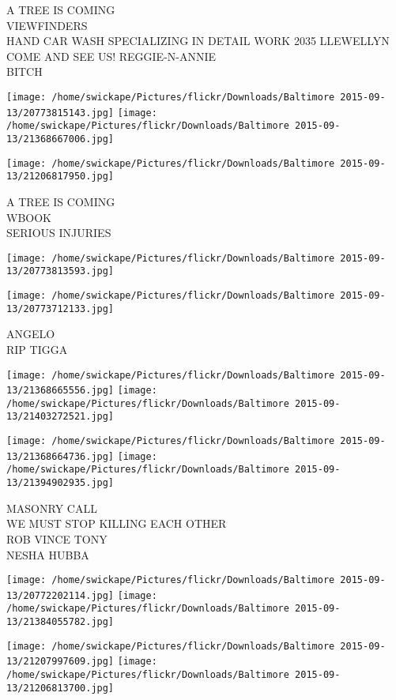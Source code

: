 \documentclass[10pt,letterpaper]{article}
\begin{document}
A TREE IS COMING\\
VIEWFINDERS\\
HAND CAR WASH SPECIALIZING IN DETAIL WORK 2035 LLEWELLYN COME AND SEE US!  REGGIE{-}N{-}ANNIE\\
BITCH
\pagebreak

\texttt{[image: /home/swickape/Pictures/flickr/Downloads/Baltimore 2015-09-13/20773815143.jpg]}
\texttt{[image: /home/swickape/Pictures/flickr/Downloads/Baltimore 2015-09-13/21368667006.jpg]}

\texttt{[image: /home/swickape/Pictures/flickr/Downloads/Baltimore 2015-09-13/21206817950.jpg]}

A TREE IS COMING\\
WBOOK\\
SERIOUS INJURIES
\pagebreak

\texttt{[image: /home/swickape/Pictures/flickr/Downloads/Baltimore 2015-09-13/20773813593.jpg]}

\vspace{0.25in}
\texttt{[image: /home/swickape/Pictures/flickr/Downloads/Baltimore 2015-09-13/20773712133.jpg]}

ANGELO\\
RIP TIGGA
\pagebreak

\texttt{[image: /home/swickape/Pictures/flickr/Downloads/Baltimore 2015-09-13/21368665556.jpg]}
\texttt{[image: /home/swickape/Pictures/flickr/Downloads/Baltimore 2015-09-13/21403272521.jpg]}

\texttt{[image: /home/swickape/Pictures/flickr/Downloads/Baltimore 2015-09-13/21368664736.jpg]}
\texttt{[image: /home/swickape/Pictures/flickr/Downloads/Baltimore 2015-09-13/21394902935.jpg]}

MASONRY CALL\\
WE MUST STOP KILLING EACH OTHER\\
ROB VINCE TONY\\
NESHA HUBBA
\pagebreak

\texttt{[image: /home/swickape/Pictures/flickr/Downloads/Baltimore 2015-09-13/20772202114.jpg]}
\texttt{[image: /home/swickape/Pictures/flickr/Downloads/Baltimore 2015-09-13/21384055782.jpg]}

\texttt{[image: /home/swickape/Pictures/flickr/Downloads/Baltimore 2015-09-13/21207997609.jpg]}
\texttt{[image: /home/swickape/Pictures/flickr/Downloads/Baltimore 2015-09-13/21206813700.jpg]}
\end{document}
